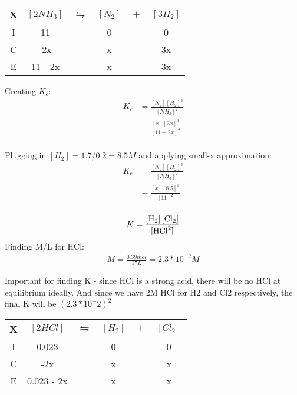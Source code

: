 \documentclass{article}  %
\begin{document}
\begin{tabular}{c|c@{}c@{}c@{}c@{}c}
    \hline
    X   &   $[2NH_3]$ & ${}\leftrightharpoons{}$ & $[N_2]$ & ${}+{}$ & $[3H_2]$\\
    \hline
    I   & 11          &&   0                           &&  0       \\
    C   & -2x         &&   x                           &&  3x      \\
    E   & 11 - 2x     &&   x                           &&  3x      \\
    \hline
\end{tabular}

Creating $K_c$:
\begin{equation*}
    \begin{aligned}
        K_c &= \frac{[N_2][H_2]^3}{[NH_3]^2} \\
            &= \frac{[x][3x]^3}{[11-2x]^2} \\
    \end{aligned}
\end{equation*}

Plugging in $[H_2] = 1.7/0.2 = 8.5M$ and applying small-x approximation:
\begin{equation*}
    \begin{aligned}
        K_c &= \frac{[N_2][H_2]^3}{[NH_3]^2} \\
            &= \frac{[x][8.5]^3}{[11]^2} \\
    \end{aligned}
\end{equation*}

\begin{equation*}
    \begin{aligned}
        K = \ce{\frac{[H_2] [Cl_2]}{[HCl^2]}}
    \end{aligned}
\end{equation*}
Finding M/L for HCl:
\begin{equation*}
    \begin{aligned}
        M = \frac{0.39mol}{17L} = 2.3*10^{-2}M
    \end{aligned}
\end{equation*}

Important for finding K - since HCl is a strong acid, there will be no HCl at equilibrium ideally. And since we have 2M HCl for H2 and Cl2 respectively, the final K will be $\left(2.3*10^-2\right)^2$

\begin{tabular}{c|c@{}c@{}c@{}c@{}c}
    \hline
    X   &   $[2HCl]$ & ${}\leftrightharpoons{}$ & $[H_2]$ & ${}+{}$ & $[Cl_2]$\\
    \hline
    I   &  0.023     &&   0                            &&  0       \\
    C   &       -2x      &&   x                           &&  x      \\
    E   &   0.023 - 2x     &&   x                           &&  x      \\
    \hline
\end{tabular}
\end{document}
